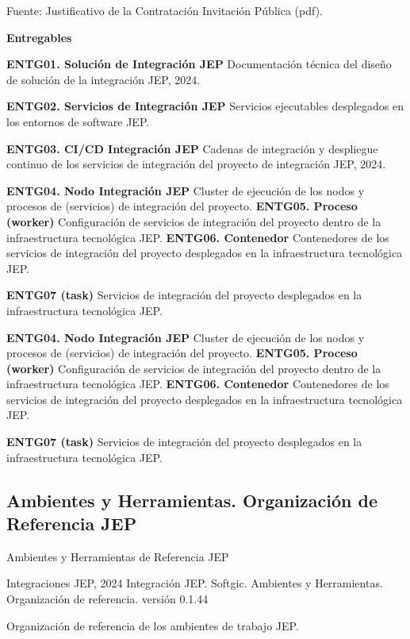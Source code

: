 \documentclass[
  paper=a4,
  ,captions=tableheading
]{scrartcl}
\renewenvironment{quote}{\begin{customblockquote}\list{}{\rightmargin=0em\leftmargin=0em}%
\item\relax\color{blockquote-text}\ignorespaces}{\unskip\unskip\endlist\end{customblockquote}}
\begin{document}
Fuente: Justificativo de la Contratación Invitación Pública (pdf).

\textbf{Entregables}

\textbf{ENTG01. Solución de Integración JEP} Documentación técnica del
diseño de solución de la integración JEP, 2024.

\textbf{ENTG02. Servicios de Integración JEP} Servicios ejecutables
desplegados en los entornos de software JEP.

\textbf{ENTG03. CI/CD Integración JEP} Cadenas de integración y
despliegue continuo de los servicios de integración del proyecto de
integración JEP, 2024.

\textbf{ENTG04. Nodo Integración JEP} Cluster de ejecución de los nodos
y procesos de (servicios) de integración del proyecto. \textbf{ENTG05.
Proceso (worker)} Configuración de servicios de integración del proyecto
dentro de la infraestructura tecnológica JEP. \textbf{ENTG06.
Contenedor} Contenedores de los servicios de integración del proyecto
desplegados en la infraestructura tecnológica JEP.

\textbf{ENTG07 (task)} Servicios de integración del proyecto desplegados
en la infraestructura tecnológica JEP.

\textbf{ENTG04. Nodo Integración JEP} Cluster de ejecución de los nodos
y procesos de (servicios) de integración del proyecto. \textbf{ENTG05.
Proceso (worker)} Configuración de servicios de integración del proyecto
dentro de la infraestructura tecnológica JEP. \textbf{ENTG06.
Contenedor} Contenedores de los servicios de integración del proyecto
desplegados en la infraestructura tecnológica JEP.

\textbf{ENTG07 (task)} Servicios de integración del proyecto desplegados
en la infraestructura tecnológica JEP.

\subsection{Ambientes y Herramientas. Organización de Referencia
JEP}\label{sec:ambientes-y-herramientas.-organizaciuxf3n-de-referencia-jep}

Ambientes y Herramientas de Referencia JEP

\begin{quote}
Integraciones JEP, 2024 Integración JEP. Softgic. Ambientes y
Herramientas. Organización de referencia. versión 0.1.44
\end{quote}

Organización de referencia de los ambientes de trabajo JEP.
\end{document}
